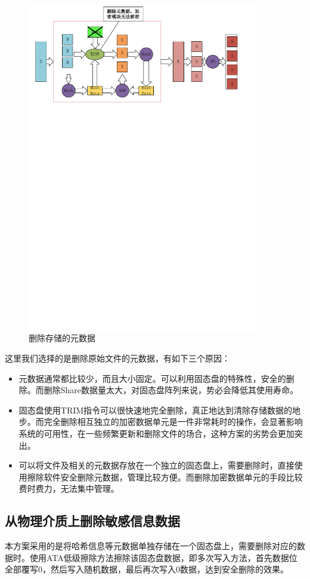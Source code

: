 \begin{figure}[H]
	\centering
	\includegraphics[width=4in]{Pics/del-hashkey.pdf}
	\caption{删除存储的元数据}\label{fig:7}
\end{figure}


这里我们选择的是删除原始文件的元数据，有如下三个原因：
\begin{itemize}
	\item 元数据通常都比较少，而且大小固定。可以利用固态盘的特殊性，安全的删除。而删除Share数据量太大，对固态盘阵列来说，势必会降低其使用寿命。
	\item 固态盘使用TRIM指令可以很快速地完全删除，真正地达到清除存储数据的地步。而完全删除相互独立的加密数据单元是一件非常耗时的操作，会显著影响系统的可用性，在一些频繁更新和删除文件的场合，这种方案的劣势会更加突出。
	\item 可以将文件及相关的元数据存放在一个独立的固态盘上，需要删除时，直接使用擦除软件安全删除元数据，管理比较方便。而删除加密数据单元的手段比较费时费力，无法集中管理。
\end{itemize}

\subsection{从物理介质上删除敏感信息数据}
本方案采用的是将哈希信息等元数据单独存储在一个固态盘上，需要删除对应的数据时。使用ATA低级擦除方法擦除该固态盘数据，即多次写入方法，首先数据位全部覆写0，然后写入随机数据，最后再次写入0数据，达到安全删除的效果\cite{Lee2008Secure,Swanson2010Safe}。

